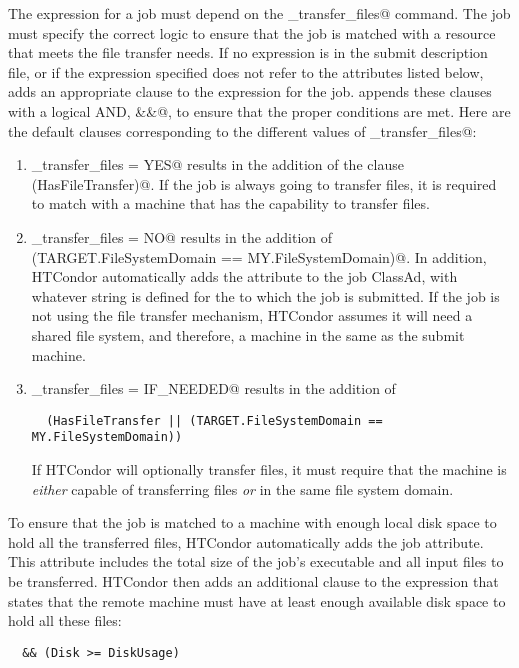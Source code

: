 The  expression for a job must depend
on the \verb@should_transfer_files@ command.
The job must specify the correct logic to ensure that the job is matched
with a resource that meets the file transfer needs.
If no  expression is in the submit description file,
or if the expression specified does not refer to the
attributes listed below,  adds an
appropriate clause to the  expression for the job.
 appends these clauses with a logical AND, \verb@&&@,
to ensure that the proper conditions are met.
Here are the default clauses corresponding to the different values of
\verb@should_transfer_files@:

\begin{enumerate}

\item 
\verb@should_transfer_files = YES@ results in the addition of
the clause \verb@(HasFileTransfer)@.
  If the job is always going to transfer files, it is required to 
  match with a machine that has the capability to transfer files.

\item 
\verb@should_transfer_files = NO@ results in the addition of
  \verb@(TARGET.FileSystemDomain == MY.FileSystemDomain)@.
  In addition, HTCondor automatically adds the
   attribute to the job ClassAd, with whatever
  string is defined for the  to which the job is
  submitted.
  If the job is not using the file transfer mechanism, HTCondor assumes
  it will need a shared file system, and therefore, a machine in the
  same  as the submit machine.

\item \verb@should_transfer_files = IF_NEEDED@ results in the addition of
\footnotesize
\begin{verbatim}
  (HasFileTransfer || (TARGET.FileSystemDomain == MY.FileSystemDomain))
\end{verbatim}
\normalsize
  If HTCondor will optionally transfer files, it must require
  that the machine is \emph{either} capable of transferring files
  \emph{or} in the same file system domain.

\end{enumerate}

To ensure that the job is matched to a machine with enough local disk
space to hold all the transferred files, HTCondor automatically adds the
 job attribute.
This attribute includes the total
size of the job's executable and all input files to be transferred.
HTCondor then adds an additional clause to the 
expression that states that the remote machine must have at least
enough available disk space to hold all these files:
\begin{verbatim}
  && (Disk >= DiskUsage)
\end{verbatim}

